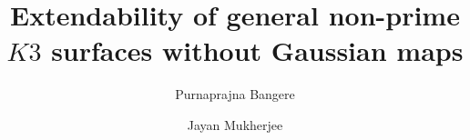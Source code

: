 \documentclass[11pt,twoside]{amsart}
\theoremstyle{plain}
\numberwithin{equation}{section}
\theoremstyle{definition}
\begin{document}
\title[Extendability of general non-prime $K3$ surfaces without Gaussian maps ]{Extendability of general non-prime $K3$ surfaces without Gaussian maps}


\author[P. Bangere]{Purnaprajna Bangere}
\address{Department of Mathematics, University of Kansas, Lawrence, USA}


\author[J. Mukherjee]{Jayan Mukherjee}
\address{Department of Mathematics, Oklahoma State University, Stillwater, USA}



\end{document}
